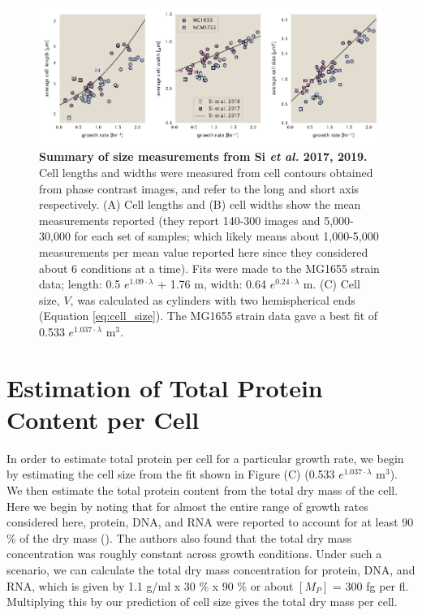 \begin{figure}
		\centering
    \includegraphics[width=1.0\textwidth]{SI_figs/Si_size_data_fit.pdf}
    \caption{\textbf{Summary of size measurements from Si \textit{et al.} 2017,
    2019.} Cell lengths and widths were measured from cell contours obtained from
    phase contrast images, and refer to the long and short axis respectively. (A)
    Cell lengths and (B) cell widths show the mean measurements reported (they
    report 140-300 images and 5,000-30,000 for each set of samples; which likely
    means about 1,000-5,000 measurements per mean value reported here since they
    considered about 6 conditions at a time). Fits were made to the  MG1655 strain
    data; length: 0.5 $e^{1.09 \cdot \lambda}$ + 1.76 \textmu m, width:  0.64
    $e^{0.24 \cdot \lambda}$ \textmu m. (C) Cell size, $V$, was calculated as
    cylinders with two hemispherical ends (Equation \ref{eq:cell_size}). The
    MG1655 strain data gave a best fit of 0.533 $e^{1.037 \cdot \lambda}$ \textmu m$^3$.}
  \label{fig:final_size_data_Si}
\end{figure}


\section{Estimation of Total Protein Content per Cell}
\label{sec:estimate_protein_per_cell}
In order to estimate total protein per cell for a particular growth rate, we
begin by estimating the cell size from the fit shown in Figure
(C) (0.533 $e^{1.037 \cdot \lambda}$ \textmu m$^3$). We
then estimate the total protein content from the total dry mass of the cell.
Here we begin by noting that  for almost the entire range of growth rates
considered here, protein, DNA, and RNA were reported to account for at least 90
\% of the dry mass (\cite{basan2015}). The authors also found that the total dry
mass concentration was roughly constant across growth conditions. Under such a
scenario, we can calculate the total dry mass concentration for protein, DNA,
and RNA, which is given by 1.1 g/ml x 30 \% x 90 \% or about $[M_P]$ = 300 fg
per fl. Multiplying this by our prediction of cell size gives the total dry mass
per cell.

